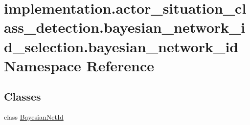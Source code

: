 \hypertarget{namespaceimplementation_1_1actor__situation__class__detection_1_1bayesian__network__id__selection_1_1bayesian__network__id}{}\section{implementation.\+actor\+\_\+situation\+\_\+class\+\_\+detection.\+bayesian\+\_\+network\+\_\+id\+\_\+selection.\+bayesian\+\_\+network\+\_\+id Namespace Reference}
\label{namespaceimplementation_1_1actor__situation__class__detection_1_1bayesian__network__id__selection_1_1bayesian__network__id}
\subsection*{Classes}
\begin{DoxyCompactItemize}
\item 
class \hyperlink{classimplementation_1_1actor__situation__class__detection_1_1bayesian__network__id__selection_1_c01f1dacd43bed2d1110fc7cec61e664}{Bayesian\+Net\+Id}
\end{DoxyCompactItemize}

